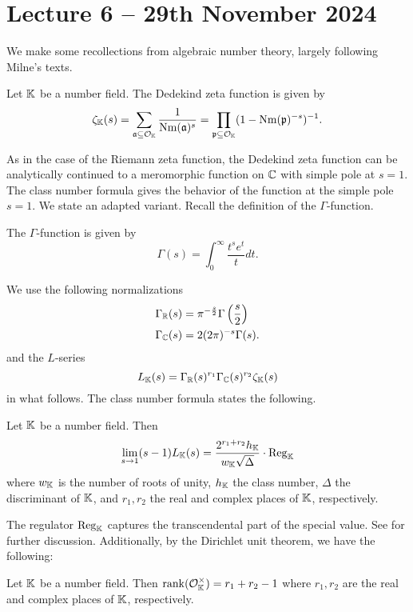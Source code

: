 \section{Lecture 6 -- 29th November 2024}\label{sec: lecture 6}
We make some recollections from algebraic number theory, largely following Milne's texts. 
\begin{definition}\label{def: Dedekind zeta}
    Let $\mathbb{K}$ be a number field. The Dedekind zeta function is given by 
    $$\zeta_{\mathbb{K}}(s)=\sum_{\mathfrak{a}\subseteq\mathcal{O}_{\mathbb{K}}}\frac{1}{\mathrm{Nm}(\mathfrak{a})^{s}}=\prod_{\mathfrak{p}\subseteq\mathcal{O}_{\mathbb{K}}}(1-\mathrm{Nm}(\mathfrak{p})^{-s})^{-1}.$$
\end{definition}
As in the case of the Riemann zeta function, the Dedekind zeta function can be analytically continued to a meromorphic function on $\mathbb{C}$ with simple pole at $s=1$. The class number formula gives the behavior of the function at the simple pole $s=1$. We state an adapted variant. Recall the definition of the $\Gamma$-function. 
\begin{definition}\label{def: gamma function}
    The $\Gamma$-function is given by 
    $$\Gamma(s)=\int_{0}^{\infty}\frac{t^{s}e^{t}}{t}dt.$$
\end{definition}
We use the following normalizations 
\begin{align*}
    \Gamma_{\mathbb{R}}(s) &= \pi^{-\frac{s}{2}}\Gamma\left(\frac{s}{2}\right) \\
    \Gamma_{\mathbb{C}}(s) &= 2(2\pi)^{-s}\Gamma(s).
\end{align*}
and the $L$-series 
\begin{equation}\label{eqn: L-series}
    L_{\mathbb{K}}(s)=\Gamma_{\mathbb{R}}(s)^{r_{1}}\Gamma_{\mathbb{C}}(s)^{r_{2}}\zeta_{\mathbb{K}}(s)
\end{equation}
in what follows. The class number formula states the following. 
\begin{theorem}\label{thm: class number formula}
    Let $\mathbb{K}$ be a number field. Then 
    $$\lim_{s\to 1}(s-1)L_{\mathbb{K}}(s)=\frac{2^{r_{1}+r_{2}}h_{\mathbb{K}}}{w_{\mathbb{K}}\sqrt{\Delta}}\cdot\mathrm{Reg}_{\mathbb{K}}$$
    where $w_{\mathbb{K}}$ is the number of roots of unity, $h_{\mathbb{K}}$ the class number, $\Delta$ the discriminant of $\mathbb{K}$, and $r_{1},r_{2}$ the real and complex places of $\mathbb{K}$, respectively.  
\end{theorem}
The regulator $\mathrm{Reg}_{\mathbb{K}}$ captures the transcendental part of the special value. See \cite[\S V.2]{milneCFT} for further discussion. Additionally, by the Dirichlet unit theorem, we have the following:
\begin{theorem}\label{thm: Dirichlet unit}
    Let $\mathbb{K}$ be a number field. Then $\mathrm{rank}(\mathcal{O}_{\mathbb{K}}^{\times})=r_{1}+r_{2}-1$ where $r_{1},r_{2}$ are the real and complex places of $\mathbb{K}$, respectively. 
\end{theorem}
